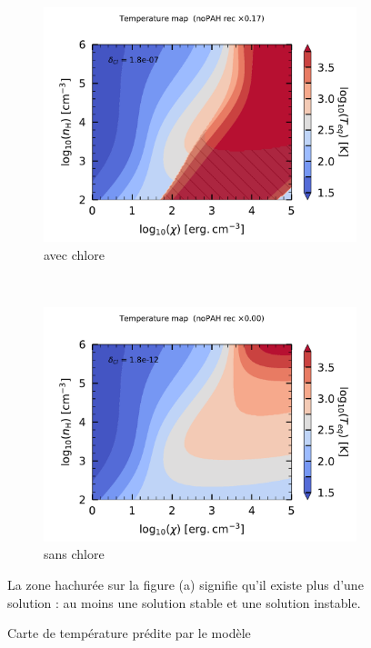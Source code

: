 \begin{figure}[!h]
    \centering
    \begin{subfigure}[t]{0.49\textwidth} %
        \centering \includegraphics[trim = {0 0 0 1cm},clip,width=1\textwidth]{figure/Cl/gridModel/mapG0nHTeq_m6p7_imp_noPAH_3p0PE_OI_CII_ggr_elecrec_lyman_OI.pdf}
        \caption{avec chlore}
    \end{subfigure}
    ~ 
    \begin{subfigure}[t]{0.49\textwidth}
        \centering \includegraphics[trim = {0 0 0 1cm},clip,width=1\textwidth]{figure/Cl/gridModel/mapG0nHTeq_m11p7_exp_noPAH_3p0PE_OI_CII_ggr_elecrec_lyman_OI.pdf}
        \caption{sans chlore}
    \end{subfigure}
    \caption{Carte de température prédite par le modèle}
     \begin{minipage}{\textwidth} 
     La zone hachurée sur la figure (a) signifie qu'il existe plus d'une solution : au moins une solution stable et une solution instable.
     \label{fig:Cl:gridModel:Tba:noCl}
     \end{minipage}
    \label{fig:Cl:gridModel:Tba}
\end{figure}

